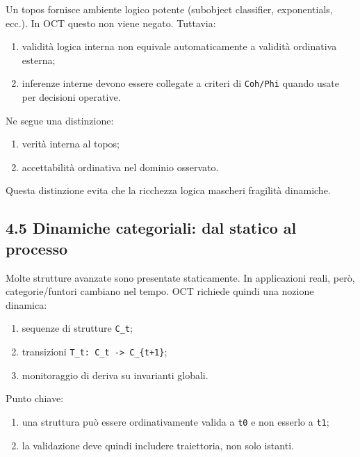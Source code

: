 Un topos fornisce ambiente logico potente (subobject classifier, exponentials, ecc.). In OCT questo non viene negato. Tuttavia:

\begin{enumerate}
\def\labelenumi{\arabic{enumi}.}
\tightlist
\item
  validità logica interna non equivale automaticamente a validità ordinativa esterna;
\item
  inferenze interne devono essere collegate a criteri di \texttt{Coh/Phi} quando usate per decisioni operative.
\end{enumerate}

Ne segue una distinzione:

\begin{enumerate}
\def\labelenumi{\arabic{enumi}.}
\tightlist
\item
  verità interna al topos;
\item
  accettabilità ordinativa nel dominio osservato.
\end{enumerate}

Questa distinzione evita che la ricchezza logica mascheri fragilità dinamiche.

\subsection{4.5 Dinamiche categoriali: dal statico al processo}

Molte strutture avanzate sono presentate staticamente. In applicazioni reali, però, categorie/funtori cambiano nel tempo. OCT richiede quindi una nozione dinamica:

\begin{enumerate}
\def\labelenumi{\arabic{enumi}.}
\tightlist
\item
  sequenze di strutture \texttt{C\_t};
\item
  transizioni \texttt{T\_t:\ C\_t\ -\textgreater{}\ C\_\{t+1\}};
\item
  monitoraggio di deriva su invarianti globali.
\end{enumerate}

Punto chiave:

\begin{enumerate}
\def\labelenumi{\arabic{enumi}.}
\tightlist
\item
  una struttura può essere ordinativamente valida a \texttt{t0} e non esserlo a \texttt{t1};
\item
  la validazione deve quindi includere traiettoria, non solo istanti.
\end{enumerate}

